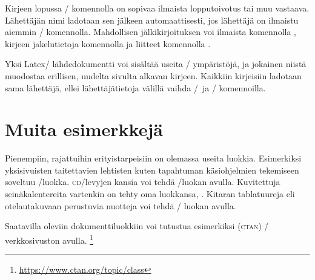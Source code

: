 Kirjeen lopussa \-/ komennolla on sopivaa ilmaista
lopputoivotus tai muu vastaava. Lähettäjän nimi ladotaan sen jälkeen
automaattisesti, jos lähettäjä on ilmaistu aiemmin
\-/ komennolla. Mahdollisen jälkikirjoituksen voi
ilmaista komennolla , kirjeen jakelutietoja komennolla
 ja liitteet komennolla .

Yksi Latex\-/ lähdedokumentti voi sisältää useita \-/
ympäristöjä, ja jokainen niistä muodostaa erillisen, uudelta sivulta
alkavan kirjeen. Kaikkiin kirjeisiin ladotaan sama lähettäjä, ellei
lähettäjätietoja välillä vaihda \-/\ ja
\-/ komennoilla.

\section{Muita esimerkkejä}

Pienempiin, rajattuihin erityistarpeisiin on olemassa useita luokkia.
Esimerkiksi yksisivuisten taitettavien lehtisten kuten tapahtuman
käsiohjelmien tekemiseen soveltuu \-/luokka.
\textsc{cd}\-/levyjen kansia voi tehdä \-/luokan avulla.
Kuvitettuja seinäkalentereita vartenkin on tehty oma luokkansa,
. Kitaran tablatuureja eli otelautakuvaan
perustuvia nuotteja voi tehdä \-/ luokan avulla.

Saatavilla oleviin dokumenttiluokkiin voi tutustua esimerkiksi
 (\textsc{ctan})
\=/verkkosivuston avulla.%
\footnote{\url{https://www.ctan.org/topic/class}}
